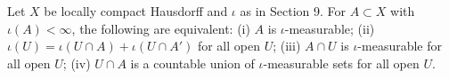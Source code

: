 Let $X$ be locally compact Hausdorff and $\iota$ as in Section 9. For $A \subset X$ with $\iota(A) < \infty$, the following are equivalent:
(i) $A$ is $\iota$-measurable;
(ii) $\iota(U) = \iota(U \cap A) + \iota(U \cap A')$ for all open $U$;
(iii) $A \cap U$ is $\iota$-measurable for all open $U$;
(iv) $U \cap A$ is a countable union of $\iota$-measurable sets for all open $U$.